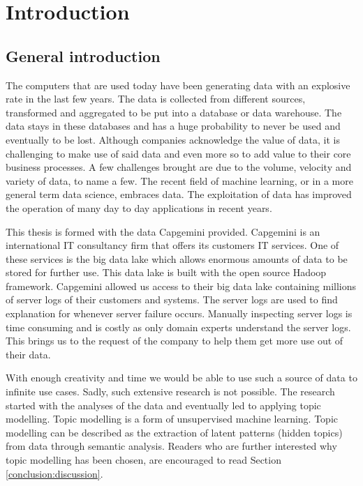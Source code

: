 \chapter{Introduction} \label{ch:introduction}

\section{General introduction}\label{introduction:Generalinformation}
The computers that are used today have been generating data with an explosive rate in the last few years. The data is collected from different sources, transformed and aggregated to be put into a database or data warehouse. The data stays in these databases and has a huge probability to never be used and eventually to be lost. Although companies acknowledge the value of data, it is challenging to make use of said data and even more so to add value to their core business processes. A few challenges brought are due to the volume, velocity and variety of data, to name a few. The recent field of machine learning, or in a more general term data science, embraces data. The exploitation of data has improved the operation of many day to day applications in recent years. 

\setlength{\parindent}{3ex} This thesis is formed with the data Capgemini provided. Capgemini is an international IT consultancy firm that offers its customers IT services. One of these services is the big data lake which allows enormous amounts of data to be stored for further use. This data lake is built with the open source Hadoop framework. Capgemini allowed us access to their big data lake containing millions of server logs of their customers and systems. The server logs are used to find explanation for whenever server failure occurs. Manually inspecting server logs is time consuming and is costly as only domain experts understand the server logs. This brings us to the request of the company to help them get more use out of their data. 

With enough creativity and time we would be able to use such a source of data to infinite use cases. Sadly, such extensive research is not possible. The research started with the analyses of the data and eventually led to applying topic modelling. Topic modelling is a form of unsupervised machine learning. Topic modelling can be described as the extraction of latent patterns (hidden topics) from data through semantic analysis. Readers who are further interested why topic modelling has been chosen, are encouraged to read Section \ref{conclusion:discussion}. 

